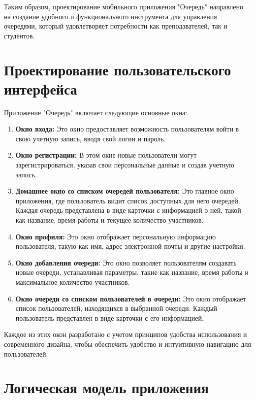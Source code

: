 Таким образом, проектирование мобильного приложения "Очередь" направлено
на создание удобного и функционального инструмента для управления очередями,
который удовлетворяет потребности как преподавателей, так и студентов.

\section{Проектирование пользовательского интерфейса}\label{sc:designing:ui}

Приложение "Очередь" включает следующие основные окна:

\begin{enumerate}
    \item \textbf{Окно входа:} Это окно предоставляет возможность
		пользователям войти в свою учетную запись, вводя свой логин и пароль.
    \item \textbf{Окно регистрации:} В этом окне новые пользователи могут
		зарегистрироваться, указав свои персональные данные
		и создав учетную запись.
    \item \textbf{Домашнее окно со списком очередей пользователя:}
		Это главное окно приложения, где пользователь видит список доступных
		для него очередей. Каждая очередь представлена в виде карточки
		с информацией о ней, такой как название,
		время работы и текущее количество участников.
    \item \textbf{Окно профиля:} Это окно отображает персональную информацию
		пользователя, такую как имя,
		адрес электронной почты и другие настройки.
    \item \textbf{Окно добавления очереди:} Это окно позволяет пользователям
		создавать новые очереди, устанавливая параметры,
		такие как название, время работы и максимальное количество участников.
    \item \textbf{Окно очереди со списком пользователей в очереди:}
		Это окно отображает список пользователей, находящихся
		в выбранной очереди. Каждый пользователь представлен в виде карточки
		с его информацией.
\end{enumerate}

Каждое из этих окон разработано с учетом принципов удобства использования
и современного дизайна, чтобы обеспечить удобство и интуитивную навигацию
для пользователей.

\section{Логическая модель приложения}

